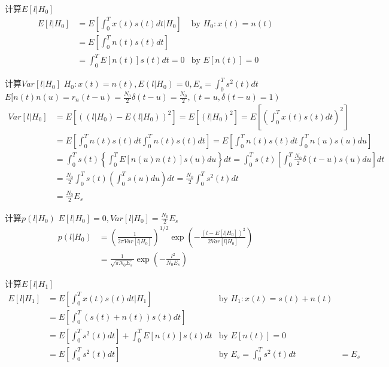 \begin{frame}{计算$E[l|H_0]$}
\begin{align*}
E[l|H_0]&=E\left[\int_{0}^{T}x(t)s(t)dt|H_0\right] &\text{by }H_0: x(t)=n(t)\\
&=E\left[\int_{0}^{T}n(t)s(t)dt\right]&\\
&=\int_{0}^{T}E[n(t)]s(t)dt=0 &\text{by }E[n(t)]=0
\end{align*}
\end{frame}

\begin{frame}{计算$Var[l|H_0]$}
$H_0:x(t)=n(t), E(l|H_0)=0,E_s=\int_{0}^{T}s^2(t)dt$\\
$E[n(t)n(u)=r_n(t-u)=\frac{N_0}{2}\delta(t-u)=\frac{N_0}{2},(t=u,\delta(t-u)=1)$
\begin{align*}
Var[l|H_0]&=E[((l|H_0)-E(l|H_0))^2]=E[(l|H_0)^2]=E\left[\left(\int_{0}^{T}x(t)s(t)dt\right)^2\right]\\
&=E\left[\int_{0}^{T}n(t)s(t)dt\int_{0}^{T}n(t)s(t)dt\right]=E\left[\int_{0}^{T}n(t)s(t)dt\int_{0}^{T}n(u)s(u)du\right]\\
&=\int_{0}^{T}s(t)\left\{\int_{0}^{T}E[n(u)n(t)]s(u)du\right\}dt=\int_{0}^{T}s(t)\left[\int_{0}^{T}\frac{N_0}{2}\delta(t-u)s(u)du\right]dt\\
&=\frac{N_0}{2}\int_{0}^{T}s(t)\left(\int_{0}^{T}s(u)du\right)dt=\frac{N_0}{2}\int_{0}^{T}s^2(t)dt\\
&=\frac{N_0}{2}E_s
\end{align*}
\end{frame}

\begin{frame}{计算$p(l|H_0)$}
$E[l|H_0]=0,Var[l|H_0]=\frac{N_0}{2}E_s$
\begin{align*}
p(l|H_0)&=\left(\frac{1}{2\pi Var[l|H_0]}\right)^{1/2}\exp\left(-\frac{(l-E[l|H_0])^2}{2Var[l|H_0]}\right)\\
&=\frac{1}{\sqrt{\pi N_0E_s}}\exp\left(-\frac{l^2}{N_0E_s}\right)
\end{align*}
\end{frame}

\begin{frame}{计算$E[l|H_1]$}
\begin{align*}
E[l|H_1]&=E\left[\int_{0}^{T}x(t)s(t)dt|H_1\right] &\text{by }H_1: x(t)=s(t)+n(t)\\
&=E\left[\int_{0}^{T}(s(t)+n(t))s(t)dt\right]&\\
&=E\left[\int_{0}^{T}s^2(t)dt\right]+\int_{0}^{T}E[n(t)]s(t)dt& \text{by } E[n(t)]=0 \\
&=E\left[\int_{0}^{T}s^2(t)dt\right]& \text{by } E_s=\int_{0}^{T}s^2(t)dt 
&=E_s
\end{align*}
\end{frame}

